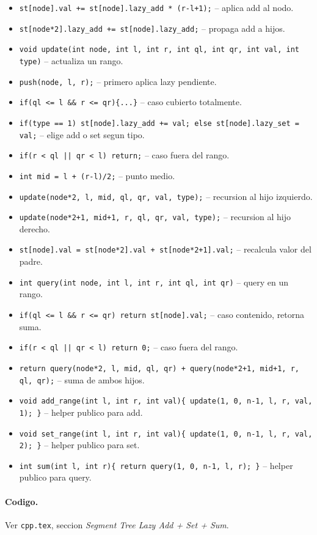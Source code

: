 \begin{itemize}
	\item \texttt{st[node].val += st[node].lazy\_add * (r-l+1);} -- aplica add al nodo.
	\item \texttt{st[node*2].lazy\_add += st[node].lazy\_add;} -- propaga add a hijos.
	\item \texttt{void update(int node, int l, int r, int ql, int qr, int val, int type)} -- actualiza un rango.
	\item \texttt{push(node, l, r);} -- primero aplica lazy pendiente.
	\item \texttt{if(ql <= l \&\& r <= qr)\{...\}} -- caso cubierto totalmente.
	\item \texttt{if(type == 1) st[node].lazy\_add += val; else st[node].lazy\_set = val;} -- elige add o set segun tipo.
	\item \texttt{if(r < ql || qr < l) return;} -- caso fuera del rango.
	\item \texttt{int mid = l + (r-l)/2;} -- punto medio.
	\item \texttt{update(node*2, l, mid, ql, qr, val, type);} -- recursion al hijo izquierdo.
	\item \texttt{update(node*2+1, mid+1, r, ql, qr, val, type);} -- recursion al hijo derecho.
	\item \texttt{st[node].val = st[node*2].val + st[node*2+1].val;} -- recalcula valor del padre.
	\item \texttt{int query(int node, int l, int r, int ql, int qr)} -- query en un rango.
	\item \texttt{if(ql <= l \&\& r <= qr) return st[node].val;} -- caso contenido, retorna suma.
	\item \texttt{if(r < ql || qr < l) return 0;} -- caso fuera del rango.
	\item \texttt{return query(node*2, l, mid, ql, qr) + query(node*2+1, mid+1, r, ql, qr);} -- suma de ambos hijos.
	\item \texttt{void add\_range(int l, int r, int val)\{ update(1, 0, n-1, l, r, val, 1); \}} -- helper publico para add.
	\item \texttt{void set\_range(int l, int r, int val)\{ update(1, 0, n-1, l, r, val, 2); \}} -- helper publico para set.
	\item \texttt{int sum(int l, int r)\{ return query(1, 0, n-1, l, r); \}} -- helper publico para query.
\end{itemize}

\paragraph{Codigo.}
Ver \texttt{cpp.tex}, seccion \textit{Segment Tree Lazy Add + Set + Sum}.

\vspace{0.5em}